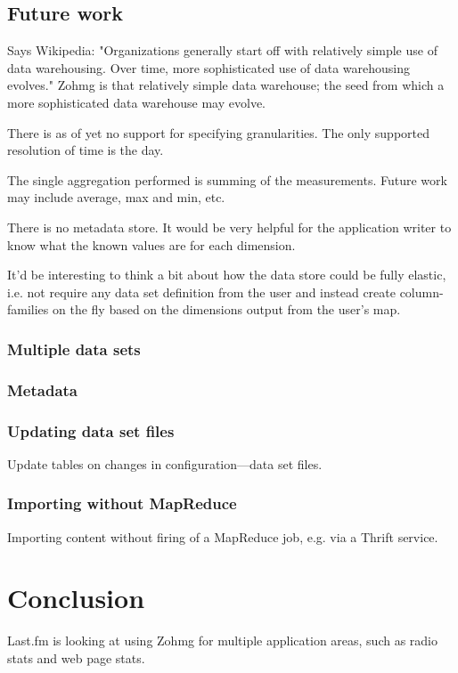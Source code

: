 \documentclass[a4paper,10pt]{book}
\begin{document}
\section{Future work}

Says Wikipedia: "Organizations generally start off with relatively simple use of data warehousing. Over time, more sophisticated use of data warehousing evolves." Zohmg is that relatively simple data warehouse; the seed from which a more sophisticated data warehouse may evolve.

There is as of yet no support for specifying granularities. The only supported resolution of time is the day.

The single aggregation performed is summing of the measurements. Future work may include average, max and min, etc.

There is no metadata store. It would be very helpful for the application writer to know what the known values are for each dimension.

It'd be interesting to think a bit about how the data store could be fully elastic, i.e. not require any data set definition from the user and instead create column-families on the fly based on the dimensions output from the user's map.

\subsection{Multiple data sets}

\subsection{Metadata}

\subsection{Updating data set files}

Update tables on changes in configuration---data set files.

\subsection{Importing without MapReduce}

Importing content without firing of a MapReduce job, e.g. via a Thrift
service.



\chapter{Conclusion}

Last.fm is looking at using Zohmg for multiple application areas, such as
radio stats and web page stats.


\pagebreak



 
\end{document}

